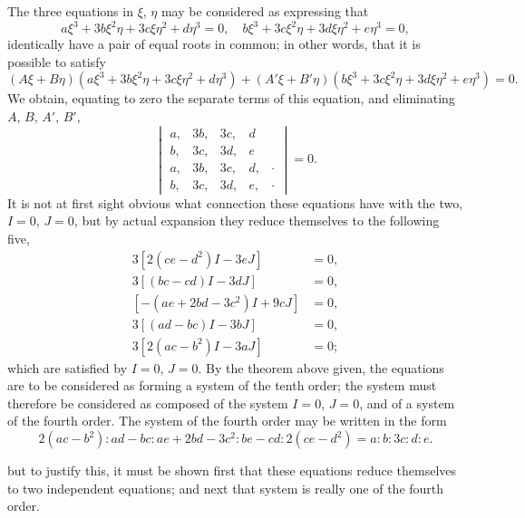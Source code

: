 \documentclass[11pt,a4paper]{book}
\begin{document}
The three equations in $\xi$, $\eta$ may be considered as expressing that
\[
a\xi^{3} + 3b\xi^{2}\eta + 3c\xi\eta^{2} + d\eta^{3} = 0, \quad b\xi^{3} + 3c\xi^{2}\eta + 3d\xi\eta^{2} + e\eta^{3} = 0,
\]
identically have a pair of equal roots in common; in other words, that it is possible to satisfy
\[
(A\xi + B\eta)(a\xi^{3} + 3b\xi^{2}\eta + 3c\xi\eta^{2} + d\eta^{3}) + (A'\xi + B'\eta)(b\xi^{3} + 3c\xi^{2}\eta + 3d\xi\eta^{2} + e\eta^{3}) = 0.
\]
We obtain, equating to zero the separate terms of this equation, and eliminating $A$, $B$, $A'$, $B'$,
\[
\begin{vmatrix}
a, & 3b, & 3c, & d \\
b, & 3c, & 3d, & e \\
a, & 3b, & 3c, & d, & \cdot \\
b, & 3c, & 3d, & e, & \cdot
\end{vmatrix} = 0.
\]
It is not at first sight obvious what connection these equations have with the two, $I = 0$, $J = 0$, but by actual expansion they reduce themselves to the following five,
\begin{align*}
3[2(ce - d^{2})I - 3eJ] &= 0, \\
3[(bc - cd)I - 3dJ] &= 0, \\
[-(ae + 2bd - 3c^{2})I + 9cJ] &= 0, \\
3[(ad - bc)I - 3bJ] &= 0, \\
3[2(ac - b^{2})I - 3aJ] &= 0;
\end{align*}
which are satisfied by $I = 0$, $J = 0$. By the theorem above given, the equations are to be considered as forming a system of the tenth order; the system must therefore be considered as composed of the system $I = 0$, $J = 0$, and of a system of the fourth order. The system of the fourth order may be written in the form
\[
2(ac - b^{2}) : ad - bc : ae + 2bd - 3c^{2} : be - cd : 2(ce - d^{2}) = a : b : 3c : d : e.
\]

\newpage

\setcounter{page}{461}

but to justify this, it must be shown first that these equations reduce themselves to two independent equations; and next that system is really one of the fourth order.
\end{document}
